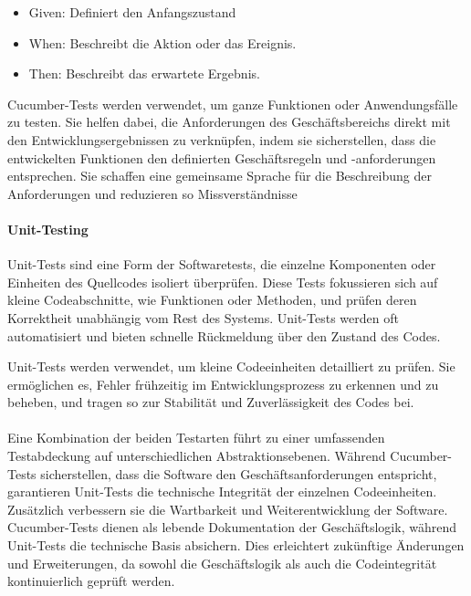 \begin{itemize}
    \item Given: Definiert den Anfangszustand
    \item When: Beschreibt die Aktion oder das Ereignis.
    \item Then: Beschreibt das erwartete Ergebnis.
\end{itemize}

Cucumber-Tests werden verwendet, um ganze Funktionen oder Anwendungsfälle zu testen. Sie helfen dabei, die Anforderungen des Geschäftsbereichs direkt mit den Entwicklungsergebnissen zu verknüpfen, indem sie sicherstellen, dass die entwickelten Funktionen den definierten Geschäftsregeln und -anforderungen entsprechen. Sie schaffen eine gemeinsame Sprache für die Beschreibung der Anforderungen und reduzieren so Missverständnisse

\paragraph{Unit-Testing}
Unit-Tests sind eine Form der Softwaretests, die einzelne Komponenten oder Einheiten des Quellcodes isoliert überprüfen. Diese Tests fokussieren sich auf kleine Codeabschnitte, wie Funktionen oder Methoden, und prüfen deren Korrektheit unabhängig vom Rest des Systems. Unit-Tests werden oft automatisiert und bieten schnelle Rückmeldung über den Zustand des Codes.

Unit-Tests werden verwendet, um kleine Codeeinheiten detailliert zu prüfen. Sie ermöglichen es, Fehler frühzeitig im Entwicklungsprozess zu erkennen und zu beheben, und tragen so zur Stabilität und Zuverlässigkeit des Codes bei.

\paragraph{}
Eine Kombination der beiden Testarten führt zu einer umfassenden Testabdeckung auf unterschiedlichen Abstraktionsebenen. Während Cucumber-Tests sicherstellen, dass die Software den Geschäftsanforderungen entspricht, garantieren Unit-Tests die technische Integrität der einzelnen Codeeinheiten. Zusätzlich verbessern sie die Wartbarkeit und Weiterentwicklung der Software. Cucumber-Tests dienen als lebende Dokumentation der Geschäftslogik, während Unit-Tests die technische Basis absichern. Dies erleichtert zukünftige Änderungen und Erweiterungen, da sowohl die Geschäftslogik als auch die Codeintegrität kontinuierlich geprüft werden.

